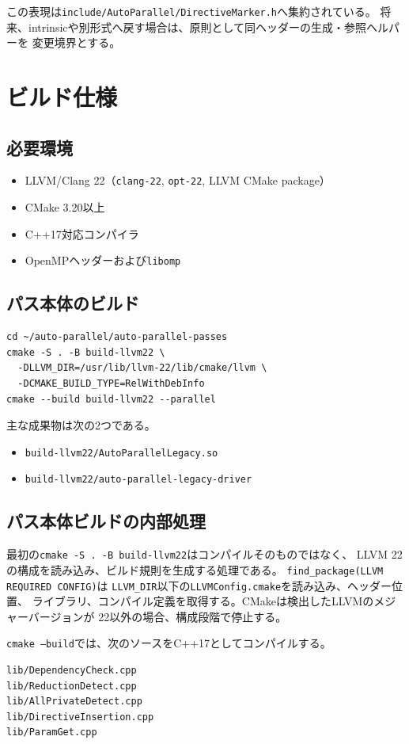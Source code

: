 \documentclass[a4paper,11pt]{ltjsarticle}
\begin{document}
この表現は\texttt{include/AutoParallel/DirectiveMarker.h}へ集約されている。
将来、intrinsicや別形式へ戻す場合は、原則として同ヘッダーの生成・参照ヘルパーを
変更境界とする。

\section{ビルド仕様}
\subsection{必要環境}
\begin{itemize}[nosep]
  \item LLVM/Clang 22（\texttt{clang-22}, \texttt{opt-22}, LLVM CMake package）
  \item CMake 3.20以上
  \item C++17対応コンパイラ
  \item OpenMPヘッダーおよび\texttt{libomp}
\end{itemize}

\subsection{パス本体のビルド}
\begin{lstlisting}
cd ~/auto-parallel/auto-parallel-passes
cmake -S . -B build-llvm22 \
  -DLLVM_DIR=/usr/lib/llvm-22/lib/cmake/llvm \
  -DCMAKE_BUILD_TYPE=RelWithDebInfo
cmake --build build-llvm22 --parallel
\end{lstlisting}

主な成果物は次の2つである。
\begin{itemize}[nosep]
  \item \texttt{build-llvm22/AutoParallelLegacy.so}
  \item \texttt{build-llvm22/auto-parallel-legacy-driver}
\end{itemize}

\subsection{パス本体ビルドの内部処理}
最初の\texttt{cmake -S . -B build-llvm22}はコンパイルそのものではなく、
LLVM 22の構成を読み込み、ビルド規則を生成する処理である。
\texttt{find\_package(LLVM REQUIRED CONFIG)}は
\texttt{LLVM\_DIR}以下の\texttt{LLVMConfig.cmake}を読み込み、ヘッダー位置、
ライブラリ、コンパイル定義を取得する。CMakeは検出したLLVMのメジャーバージョンが
22以外の場合、構成段階で停止する。

\texttt{cmake --build}では、次のソースをC++17としてコンパイルする。
\begin{lstlisting}
lib/DependencyCheck.cpp
lib/ReductionDetect.cpp
lib/AllPrivateDetect.cpp
lib/DirectiveInsertion.cpp
lib/ParamGet.cpp
\end{lstlisting}
\end{document}
